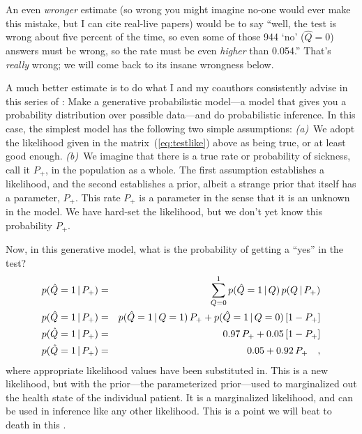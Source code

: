 \documentclass[12pt,twoside]{article}
\begin{document}
An even \emph{wronger} estimate (so wrong you might imagine no-one
would ever make this mistake, but I can cite real-live
papers) would be to say ``well, the test is wrong about
five percent of the time, so even some of those 944 `no' ($\hat{Q}=0$)
answers must be wrong, so the rate must be even \emph{higher} than
0.054.''  That's \emph{really} wrong; we will come back to its insane
wrongness below.

A much better estimate is to do what I and my coauthors consistently
advise in this series of \documentnames: Make a generative
probabilistic model---a model that gives you a probability
distribution over possible data---and do
probabilistic inference.  In this case, the simplest model has the
following two simple assumptions: \textsl{(a)}~We adopt the likelihood
given in the matrix~(\ref{eq:testlike}) above as being true, or at
least good enough.  \textsl{(b)}~We imagine that there is a true rate
or probability of sickness, call it $P_+$, in the population as a
whole.  The first assumption establishes a likelihood, and the second
establishes a prior, albeit a strange prior that itself has a
parameter, $P_+$. This rate $P_+$ is a parameter in the sense that it
is an unknown in the model.  We have hard-set the likelihood, but we
don't yet know this probability $P_+$.

Now, in this generative model, what is the probability of getting a
``yes'' in the test?
\begin{eqnarray}
p(\hat{Q}=1\,|\, P_+)
 &=& \sum_{Q=0}^1 p(\hat{Q}=1\,|\, Q)\,p(Q\,|\, P_+)
\\
p(\hat{Q}=1\,|\, P_+)
 &=& p(\hat{Q}=1\,|\, Q=1)\,P_+ + p(\hat{Q}=1\,|\, Q=0)\,[1 - P_+]
\\
p(\hat{Q}=1\,|\, P_+)
 &=& 0.97\,P_+ + 0.05\,[1 - P_+]
\\
p(\hat{Q}=1\,|\, P_+)
 &=& 0.05 + 0.92\,P_+
\quad,
\end{eqnarray}
where appropriate likelihood values have been substituted in.  This is
a new likelihood, but with the prior---the parameterized prior---used
to marginalized out the health state of the individual patient.  It is
a marginalized likelihood, and can be used in inference like any other
likelihood.  This is a point we will beat to death in this
\documentname.
\end{document}
